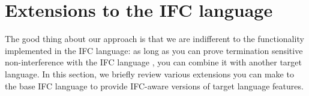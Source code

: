 \section{Extensions to the IFC language}
\label{sec:extensions}

The good thing about our approach is that we are indifferent to the
functionality implemented in the IFC language: as long as you can
prove termination sensitive non-interference with the IFC language
, you
can combine it with another target language.  In this section,
we briefly review various extensions you can make to the base IFC
language to provide IFC-aware versions of target language features.


